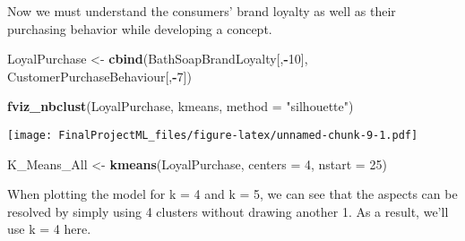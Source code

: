 \documentclass[
]{article}
\newenvironment{Shaded}{\begin{snugshade}}{\end{snugshade}}
\newcommand{\DataTypeTok}[1]{\textcolor[rgb]{0.13,0.29,0.53}{#1}}
\newcommand{\DecValTok}[1]{\textcolor[rgb]{0.00,0.00,0.81}{#1}}
\newcommand{\FloatTok}[1]{\textcolor[rgb]{0.00,0.00,0.81}{#1}}
\newcommand{\KeywordTok}[1]{\textcolor[rgb]{0.13,0.29,0.53}{\textbf{#1}}}
\newcommand{\NormalTok}[1]{#1}
\newcommand{\OperatorTok}[1]{\textcolor[rgb]{0.81,0.36,0.00}{\textbf{#1}}}
\newcommand{\OtherTok}[1]{\textcolor[rgb]{0.56,0.35,0.01}{#1}}
\newcommand{\StringTok}[1]{\textcolor[rgb]{0.31,0.60,0.02}{#1}}
\begin{document}
Now we must understand the consumers' brand loyalty as well as their
purchasing behavior while developing a concept.

\begin{Shaded}
\begin{Highlighting}[]
\NormalTok{LoyalPurchase <-}\StringTok{ }\KeywordTok{cbind}\NormalTok{(BathSoapBrandLoyalty[,}\OperatorTok{-}\DecValTok{10}\NormalTok{], CustomerPurchaseBehaviour[,}\OperatorTok{-}\DecValTok{7}\NormalTok{])}

\KeywordTok{fviz_nbclust}\NormalTok{(LoyalPurchase, kmeans, }\DataTypeTok{method =} \StringTok{"silhouette"}\NormalTok{)}
\end{Highlighting}
\end{Shaded}

\texttt{[image: FinalProjectML\_files/figure-latex/unnamed-chunk-9-1.pdf]}

\begin{Shaded}
\begin{Highlighting}[]
\NormalTok{K_Means_All <-}\StringTok{ }\KeywordTok{kmeans}\NormalTok{(LoyalPurchase, }\DataTypeTok{centers =} \DecValTok{4}\NormalTok{, }\DataTypeTok{nstart =} \DecValTok{25}\NormalTok{)}
\end{Highlighting}
\end{Shaded}

When plotting the model for k = 4 and k = 5, we can see that the aspects
can be resolved by simply using 4 clusters without drawing another 1. As
a result, we'll use k = 4 here.

\begin{Shaded}
\end{Shaded}
\end{document}
